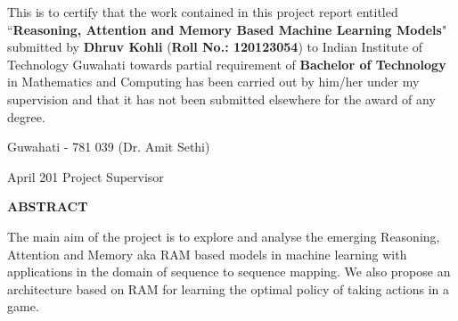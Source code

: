 \documentclass[12pt,a4paper]{report}
\theoremstyle{plain}
\theoremstyle{definition}
\theoremstyle{remark}
\begin{document}
\noindent
This is to certify that the work contained in this project report
entitled ``{\bf Reasoning, Attention and Memory Based Machine Learning Models}" submitted
by {\bf Dhruv Kohli} ({\bf Roll No.: 120123054}) to Indian Institute of Technology Guwahati
towards partial requirement of {\bf Bachelor of Technology} in Mathematics and Computing  has been carried out
by him/her under my supervision and that it has not been submitted elsewhere
for the award of any degree.

\vspace{4cm}

\noindent Guwahati - 781 039 \hfill (Dr. Amit Sethi)

\noindent April  201 \hfill Project Supervisor


\clearpage

\begin{center}
{\Large{\bf{ABSTRACT}}}
\end{center}


The main aim of the project is to explore and analyse the emerging Reasoning, Attention and Memory aka RAM based models in machine learning with applications in the domain of sequence to sequence mapping. We also propose an architecture based on RAM for learning the optimal policy of taking actions in a game.

\clearpage


\tableofcontents
\clearpage
\listoffigures
\listoftables


\newpage

\setcounter{page}{1}












\nocite{gerla}
\nocite{m1}
\nocite{chang}




\end{document}

